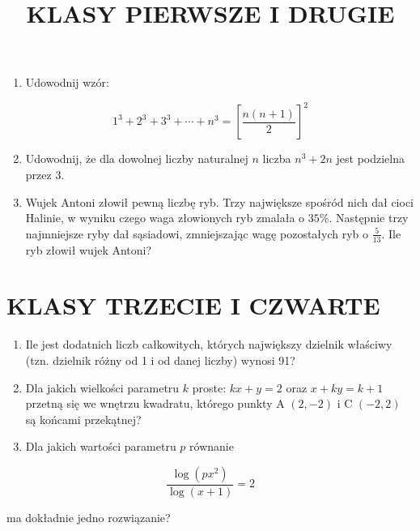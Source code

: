 \documentclass[10pt]{article}
\title{KLASY PIERWSZE I DRUGIE }
\author{}
\date{}
\begin{document}
\maketitle
\begin{enumerate}
  \item Udowodnij wzór:
\end{enumerate}

\[
1^{3}+2^{3}+3^{3}+\cdots+n^{3}=\left[\frac{n(n+1)}{2}\right]^{2}
\]

\begin{enumerate}
  \setcounter{enumi}{1}
  \item Udowodnij, że dla dowolnej liczby naturalnej \(n\) liczba \(n^{3}+2 n\) jest podzielna przez 3.
  \item Wujek Antoni złowił pewną liczbę ryb. Trzy największe spośród nich dał cioci Halinie, w wyniku czego waga złowionych ryb zmalała o \(35 \%\). Następnie trzy najmniejsze ryby dał sąsiadowi, zmniejszając wagę pozostałych ryb o \(\frac{5}{13}\). Ile ryb złowił wujek Antoni?
\end{enumerate}

\section*{KLASY TRZECIE I CZWARTE}
\begin{enumerate}
  \item Ile jest dodatnich liczb całkowitych, których największy dzielnik właściwy (tzn. dzielnik różny od 1 i od danej liczby) wynosi 91?
  \item Dla jakich wielkości parametru \(k\) proste: \(k x+y=2\) oraz \(x+k y=k+1\) przetną się we wnętrzu kwadratu, którego punkty A \((2,-2)\) i C \((-2,2)\) są końcami przekątnej?
  \item Dla jakich wartości parametru \(p\) równanie
\end{enumerate}

\[
\frac{\log \left(p x^{2}\right)}{\log (x+1)}=2
\]

ma dokładnie jedno rozwiązanie?
\end{document}
